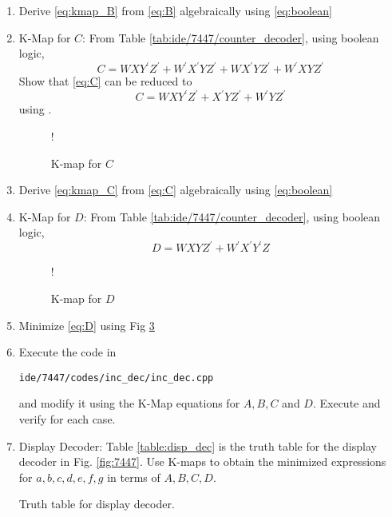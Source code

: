 \begin{enumerate}[label=\arabic*.,ref=\theenumi]
%
Show that \eqref{eq:B} can be reduced to
\begin{equation}
\label{eq:kmap_B}
B = WX^{\prime}Z^{\prime} + W^{\prime}XZ^{\prime}
\end{equation}
using Fig \ref{fig:kmap_B}
%
\begin{figure}[H]
	\centering
\resizebox {0.5\columnwidth} {!} {

}
\caption{K-map for $B$}
\label{fig:kmap_B}
\end{figure}
\item Derive \eqref{eq:kmap_B} from \eqref{eq:B} algebraically using \eqref{eq:boolean}
%
\item {K-Map for $C$: }
From Table \ref{tab:ide/7447/counter_decoder}, using boolean logic,
\begin{equation}
\label{eq:C}
C = WXY^{\prime}Z^{\prime} + W^{\prime}X^{\prime}YZ^{\prime}
+WX^{\prime}YZ^{\prime}
+W^{\prime}XYZ^{\prime}
\end{equation}
%
%
Show that \eqref{eq:C} can be reduced to
\begin{equation}
\label{eq:kmap_C}
C = WXY^{\prime}Z^{\prime}  +  X^{\prime}YZ^{\prime} + W^{\prime}YZ^{\prime}
\end{equation}
using .
%
\begin{figure}[H]
	\centering
\resizebox {0.5\columnwidth} {!} {

}
\caption{K-map for $C$}
\label{fig:kmap_C}
\end{figure}
%
\item 
Derive \eqref{eq:kmap_C} from \eqref{eq:C} algebraically using \eqref{eq:boolean}
%
\item {K-Map for $D$: }
From Table \ref{tab:ide/7447/counter_decoder}, using boolean logic,
\begin{equation}
\label{eq:D}
D = WXYZ^{\prime} + W^{\prime}X^{\prime}Y^{\prime}Z
\end{equation}
%
\begin{figure}[!htb]
	\centering
\resizebox {0.5\columnwidth} {!} {

}
\caption{K-map for $D$}
\label{fig:kmap_D}
\end{figure}
%
\item 
Minimize \eqref{eq:D} using Fig \ref{fig:kmap_D}
%
\item Execute the code in
\begin{lstlisting}
ide/7447/codes/inc_dec/inc_dec.cpp
\end{lstlisting}
%
and modify it using the K-Map equations for $A,B,C$ and $D$. Execute and verify for each case.
\item {Display Decoder:}
Table \ref{table:disp_dec} is the truth table for the display decoder in Fig.
\ref{fig:7447}.
Use K-maps to obtain the minimized expressions for $a,b,c,d,e,f,g$ in terms of $A,B,C,D$.
%
\begin{table}[H]
	\centering

\caption{Truth table for display decoder.}
\label{table:disp_dec}
\end{table}
\end{enumerate}


